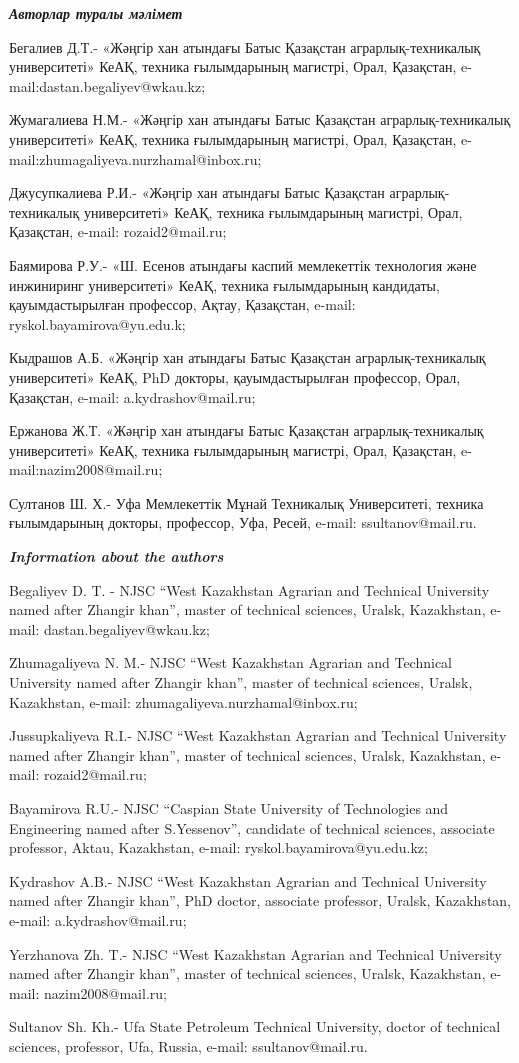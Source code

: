 \begin{info}
\emph{{\bfseries Авторлар туралы мәлімет}}

Бегалиев Д.Т.- «Жәңгір хан атындағы Батыс Қазақстан
аграрлық-техникалық университеті» КеАҚ, техника ғылымдарының магистрі,
Орал, Қазақстан, e-mail:dastan.begaliyev@wkau.kz;

Жумагалиева Н.М.- «Жәңгір хан атындағы Батыс Қазақстан
аграрлық-техникалық университеті» КеАҚ, техника ғылымдарының магистрі,
Орал, Қазақстан, e-mail:zhumagaliyeva.nurzhamal@inbox.ru;

Джусупкалиева Р.И.- «Жәңгір хан атындағы Батыс Қазақстан
аграрлық-техникалық университеті» КеАҚ, техника ғылымдарының магистрі,
Орал, Қазақстан, e-mail: rozaid2@mail.ru;

Баямирова Р.У.- «Ш. Есенов атындағы каспий мемлекеттік технология және
инжиниринг университеті» КеАҚ, техника ғылымдарының кандидаты,
қауымдастырылған профессор, Ақтау, Қазақстан, e-mail:
ryskol.bayamirova@yu.edu.k;

Кыдрашов А.Б. «Жәңгір хан атындағы Батыс Қазақстан аграрлық-техникалық
университеті» КеАҚ, PhD докторы, қауымдастырылған профессор, Орал,
Қазақстан, e-mail: a.kydrashov@mail.ru;

Ержанова Ж.Т. «Жәңгір хан атындағы Батыс Қазақстан аграрлық-техникалық
университеті» КеАҚ, техника ғылымдарының магистрі, Орал, Қазақстан,
e-mail:nazim2008@mail.ru;

Султанов Ш. Х.- Уфа Мемлекеттік Мұнай Техникалық Университеті, техника
ғылымдарының докторы, профессор, Уфа, Ресей, e-mail:
ssultanov@mail.ru.

\emph{{\bfseries Information about the authors}}

Begaliyev D. T. - NJSC ``West Kazakhstan Agrarian and Technical
University named after Zhangir khan'', master of technical sciences,
Uralsk, Kazakhstan, e-mail: dastan.begaliyev@wkau.kz;

Zhumagaliyeva N. M.- NJSC ``West Kazakhstan Agrarian and Technical
University named after Zhangir khan'', master of technical sciences,
Uralsk, Kazakhstan, e-mail: zhumagaliyeva.nurzhamal@inbox.ru;

Jussupkaliyeva R.I.- NJSC ``West Kazakhstan Agrarian and Technical
University named after Zhangir khan'', master of technical sciences,
Uralsk, Kazakhstan, e-mail: rozaid2@mail.ru;

Bayamirova R.U.- NJSC ``Caspian State University of Technologies and
Engineering named after S.Yessenov'', candidate of technical sciences,
associate professor, Aktau, Kazakhstan, e-mail: ryskol.bayamirova@yu.edu.kz;

Kydrashov A.B.- NJSC ``West Kazakhstan Agrarian and Technical University
named after Zhangir khan'', PhD doctor, associate professor, Uralsk,
Kazakhstan, e-mail: a.kydrashov@mail.ru;

Yerzhanova Zh. T.- NJSC ``West Kazakhstan Agrarian and Technical
University named after Zhangir khan'', master of technical sciences,
Uralsk, Kazakhstan, e-mail: nazim2008@mail.ru;

Sultanov Sh. Kh.- Ufa State Petroleum Technical University, doctor of
technical sciences, professor, Ufa, Russia, e-mail: ssultanov@mail.ru.
\end{info}
